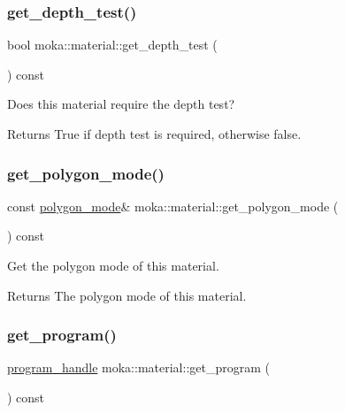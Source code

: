 \subsubsection{\texorpdfstring{get\_depth\_test()}{get\_depth\_test()}}
{\footnotesize\ttfamily bool moka\+::material\+::get\+\_\+depth\+\_\+test (\begin{DoxyParamCaption}{ }\end{DoxyParamCaption}) const}



Does this material require the depth test? 

\begin{DoxyReturn}{Returns}
True if depth test is required, otherwise false. 
\end{DoxyReturn}
\mbox{\label{classmoka_1_1material_aff4223e795cb85a9728be4ee9e994fe4}} 
\subsubsection{\texorpdfstring{get\_polygon\_mode()}{get\_polygon\_mode()}}
{\footnotesize\ttfamily const \mbox{\hyperlink{structmoka_1_1polygon__mode}{polygon\+\_\+mode}}\& moka\+::material\+::get\+\_\+polygon\+\_\+mode (\begin{DoxyParamCaption}{ }\end{DoxyParamCaption}) const}



Get the polygon mode of this material. 

\begin{DoxyReturn}{Returns}
The polygon mode of this material. 
\end{DoxyReturn}
\mbox{\label{classmoka_1_1material_ab46309b4e7b81e050085145074e12316}} 
\subsubsection{\texorpdfstring{get\_program()}{get\_program()}}
{\footnotesize\ttfamily \mbox{\hyperlink{structmoka_1_1program__handle}{program\+\_\+handle}} moka\+::material\+::get\+\_\+program (\begin{DoxyParamCaption}{ }\end{DoxyParamCaption}) const}



